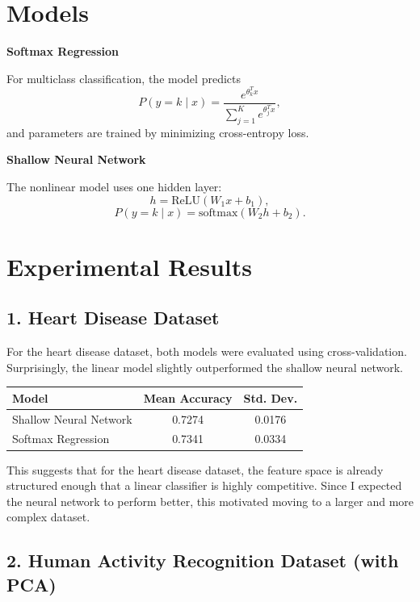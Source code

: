 \documentclass[11pt]{article}
\begin{document}
\section*{Models}

\textbf{Softmax Regression}

For multiclass classification, the model predicts
\[
P(y = k \mid x) = \frac{e^{\theta_k^T x}}{\sum_{j=1}^{K} e^{\theta_j^T x}},
\]
and parameters are trained by minimizing cross-entropy loss.

\vspace{0.5em}
\textbf{Shallow Neural Network}

The nonlinear model uses one hidden layer:
\[
h = \mathrm{ReLU}(W_1 x + b_1),
\]
\[
P(y = k \mid x) = \mathrm{softmax}(W_2 h + b_2).
\]

\section*{Experimental Results}

\subsection*{1. Heart Disease Dataset}

For the heart disease dataset, both models were evaluated using cross-validation. Surprisingly, the linear model slightly outperformed the shallow neural network.

\begin{center}
\begin{tabular}{>{\raggedright\arraybackslash}p{4.2cm}cc}
\toprule
\textbf{Model} & \textbf{Mean Accuracy} & \textbf{Std. Dev.} \\
\midrule
Shallow Neural Network & 0.7274 & 0.0176 \\
Softmax Regression & 0.7341 & 0.0334 \\
\bottomrule
\end{tabular}
\end{center}

This suggests that for the heart disease dataset, the feature space is already structured enough that a linear classifier is highly competitive. Since I expected the neural network to perform better, this motivated moving to a larger and more complex dataset.

\subsection*{2. Human Activity Recognition Dataset (with PCA)}
\end{document}
